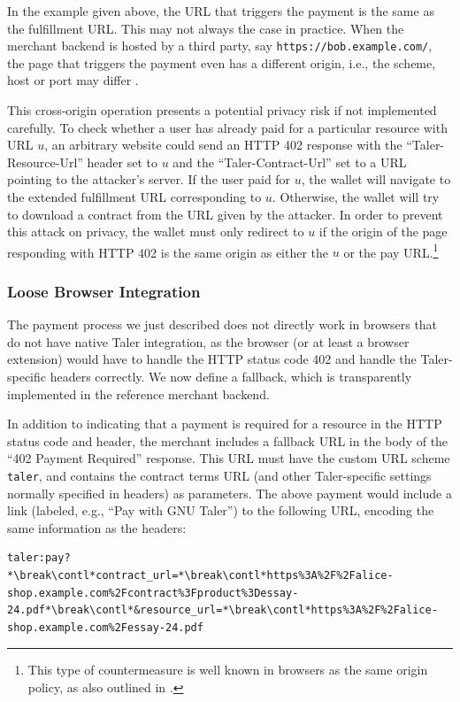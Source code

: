 In the example given above, the URL that triggers the payment is the same as the fulfillment URL.
This may not always the case in practice.  When the merchant backend is hosted by a third
party, say \nolinkurl{https://bob.example.com/}, the page that triggers the payment
even has a different origin, i.e., the scheme, host or port may differ \cite{rfc6454}.

This cross-origin operation presents a potential privacy risk if not
implemented carefully.
To check whether a user has already paid for a particular
resource with URL $u$, an arbitrary website could send an HTTP 402 response with
the ``Taler-Resource-Url'' header set to $u$ and the ``Taler-Contract-Url''
set to a URL pointing to the attacker's server.  If the user paid for $u$, the
wallet will navigate to the extended fulfillment URL corresponding to $u$.
Otherwise, the wallet will try to download a contract from the URL given by the
attacker.  In order to prevent this attack on privacy, the wallet must only
redirect to $u$ if the origin of the page responding with HTTP 402 is the same
origin as either the $u$ or the pay URL.\footnote{This type of countermeasure is well
known in browsers as the same origin policy, as also outlined in \cite{rfc6454}.}

\subsubsection{Loose Browser Integration}\label{sec:loose-browser-integration}

The payment process we just described does not directly work in browsers that do not
have native Taler integration, as the browser (or at least a browser extension)
would have to handle the HTTP status code 402 and handle the Taler-specific headers correctly.
We now define a fallback, which is transparently implemented in the reference merchant backend.

In addition to indicating that a payment is required for a resource in the HTTP status code and header,
the merchant includes a fallback URL in the body of the ``402 Payment Required'' response.  This URL must have the custom URL scheme
\texttt{taler}, and contains the contract terms URL (and other Taler-specific settings normally specified in headers)
as parameters.  The above payment would include a link (labeled, e.g., ``Pay with GNU Taler'') to the following URL, encoding
the same information as the headers:
\begin{lstlisting}[style=myhttp]
taler:pay?*\break\contl*contract_url=*\break\contl*https%3A%2F%2Falice-shop.example.com%2Fcontract%3Fproduct%3Dessay-24.pdf*\break\contl*&resource_url=*\break\contl*https%3A%2F%2Falice-shop.example.com%2Fessay-24.pdf
\end{lstlisting}

